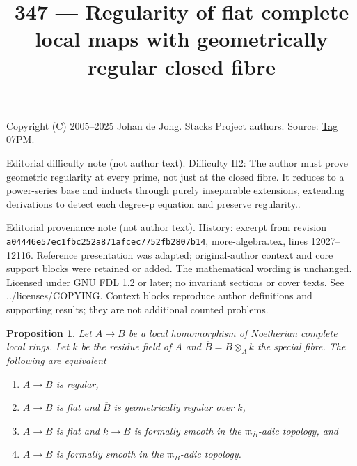 \documentclass{amsart}
\theoremstyle{plain}
\newtheorem{proposition}[subsection]{Proposition}
\theoremstyle{definition}
\theoremstyle{remark}
\numberwithin{equation}{subsection}
\begin{document}
\title[Stacks Project, Tag 07PM]{347 --- Regularity of flat complete local maps with geometrically regular closed fibre}
\maketitle
\noindent Copyright (C) 2005--2025 Johan de Jong. Stacks Project authors. Source: \href{https://stacks.math.columbia.edu/tag/07PM}{Tag 07PM}.

\noindent Editorial difficulty note (not author text). Difficulty H2: The author must prove geometric regularity at every prime, not just at the closed fibre. It reduces to a power-series base and inducts through purely inseparable extensions, extending derivations to detect each degree-p equation and preserve regularity..

\noindent Editorial provenance note (not author text). History: excerpt from revision \texttt{a0444\allowbreak 6e57e\allowbreak c1fbc\allowbreak 252a8\allowbreak 71afc\allowbreak ec775\allowbreak 2fb28\allowbreak 07b14}, more-algebra.tex, lines 12027--12116. Reference presentation was adapted; original-author context and core support blocks were retained or added. The mathematical wording is unchanged. Licensed under GNU FDL 1.2 or later; no invariant sections or cover texts. See ../licenses/COPYING. Context blocks reproduce author definitions and supporting results; they are not additional counted problems.

\begin{proposition}
\label{proposition-fs-regular}
Let $A \to B$ be a local homomorphism of Noetherian complete local rings.
Let $k$ be the residue field of $A$ and $\overline{B} = B \otimes_A k$
the special fibre.
The following are equivalent
\begin{enumerate}
\item $A \to B$ is regular,
\item $A \to B$ is flat and $\overline{B}$ is geometrically regular
over $k$,
\item $A \to B$ is flat and $k \to \overline{B}$ is formally smooth
in the $\mathfrak m_{\overline{B}}$-adic topology, and
\item $A \to B$ is formally smooth in the $\mathfrak m_B$-adic
topology.
\end{enumerate}
\end{proposition}
\end{document}

